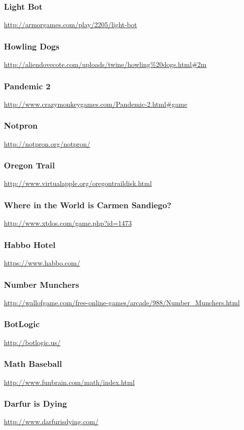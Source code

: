 \subsubsection{Light Bot}\url{http://armorgames.com/play/2205/light-bot}\subsubsection{Howling Dogs}\url{http://aliendovecote.com/uploads/twine/howling%20dogs.html#2m}\subsubsection{Pandemic 2}\url{http://www.crazymonkeygames.com/Pandemic-2.html#game}\subsubsection{Notpron}\url{http://notpron.org/notpron/}\subsubsection{Oregon Trail}\url{http://www.virtualapple.org/oregontraildisk.html}\subsubsection{Where in the World is Carmen Sandiego?}\url{http://www.xtdos.com/game.php?id=1473}\subsubsection{Habbo Hotel}\url{https://www.habbo.com/}\subsubsection{Number Munchers}\url{http://wallofgame.com/free-online-games/arcade/988/Number_Munchers.html}\subsubsection{BotLogic}\url{http://botlogic.us/}\subsubsection{Math Baseball}\url{http://www.funbrain.com/math/index.html}\subsubsection{Darfur is Dying}\url{http://www.darfurisdying.com/}